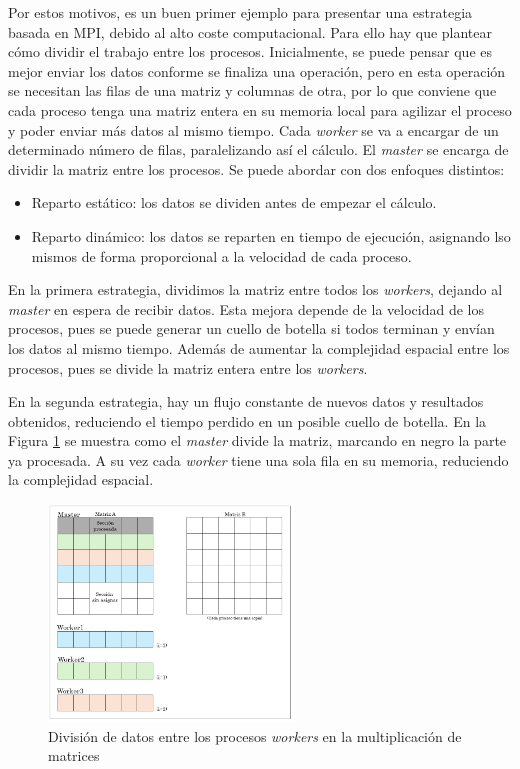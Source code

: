 	Por estos motivos, es un buen primer ejemplo para presentar una estrategia basada en MPI, debido al alto coste computacional. Para ello hay que plantear cómo dividir el trabajo entre los procesos. Inicialmente, se puede pensar que es mejor enviar los datos conforme se finaliza una operación, pero en esta operación se necesitan las filas de una matriz y columnas de otra, por lo que conviene que cada proceso tenga una matriz entera en su memoria local para agilizar el proceso y poder enviar más datos al mismo tiempo. Cada \textit{worker} se va a encargar de un determinado número de filas, paralelizando así el cálculo. El \textit{master} se encarga de dividir la matriz entre los procesos. Se puede abordar con dos enfoques distintos:
	\begin{itemize}
		\item Reparto estático: los datos se dividen antes de empezar el cálculo. 
		\item Reparto dinámico: los datos se reparten en tiempo de ejecución, asignando lso mismos de forma proporcional a la velocidad de cada proceso.
	\end{itemize}



	
	
	En la primera estrategia, dividimos la matriz entre todos los \textit{workers}, dejando al \textit{master} en espera de recibir datos. Esta mejora depende de la velocidad de los procesos, pues se puede generar un cuello de botella si todos terminan y envían los datos al mismo tiempo. Además de aumentar la complejidad espacial entre los procesos, pues se divide la matriz entera entre los \textit{workers}. 
	
	En la segunda estrategia, hay un flujo constante de nuevos datos y resultados obtenidos, reduciendo el tiempo perdido en un posible cuello de botella. En la Figura \ref{fig:matrizmpi} se muestra como el \textit{master} divide la matriz, marcando en negro la parte ya procesada. A su vez cada \textit{worker} tiene una sola fila en su memoria, reduciendo la complejidad espacial.
	
	\begin{figure}[!h]
	 	\centering
	 	\includegraphics[width=0.58\textwidth]{images/chapter_3/matriz_mpi}
	 	\caption{División de datos entre los procesos \textit{workers} en la multiplicación de matrices}
	 	\label{fig:matrizmpi}
	\end{figure}


